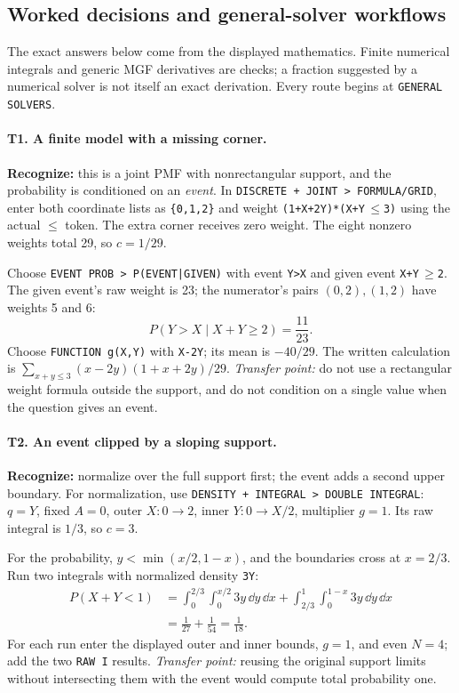 \clearpage
\subsection{Worked decisions and general-solver workflows}
The exact answers below come from the displayed mathematics. Finite numerical integrals and generic MGF derivatives are checks; a fraction suggested by a numerical solver is not itself an exact derivation. Every route begins at \texttt{GENERAL SOLVERS}.

\paragraph{T1. A finite model with a missing corner.}
\textbf{Recognize:} this is a joint PMF with nonrectangular support, and the probability is conditioned on an \emph{event}. In \texttt{DISCRETE + JOINT > FORMULA/GRID}, enter both coordinate lists as \texttt{\{0,1,2\}} and weight
\texttt{(1+X+2Y)*(X+Y}\,$\le$\texttt{3)} using the actual $\le$ token. The extra corner receives zero weight. The eight nonzero weights total 29, so $c=1/29$.

Choose \texttt{EVENT PROB > P(EVENT|GIVEN)} with event \texttt{Y>X} and given event \texttt{X+Y}\,$\ge$\texttt{2}. The given event's raw weight is 23; the numerator's pairs $(0,2),(1,2)$ have weights 5 and 6:
\[
P(Y>X\mid X+Y\ge2)=\boxed{\frac{11}{23}}.
\]
Choose \texttt{FUNCTION g(X,Y)} with \texttt{X-2Y}; its mean is $\boxed{-40/29}$. The written calculation is $\sum_{x+y\le3}(x-2y)(1+x+2y)/29$. \emph{Transfer point:} do not use a rectangular weight formula outside the support, and do not condition on a single value when the question gives an event.

\paragraph{T2. An event clipped by a sloping support.}
\textbf{Recognize:} normalize over the full support first; the event adds a second upper boundary. For normalization, use \texttt{DENSITY + INTEGRAL > DOUBLE INTEGRAL}: $q=Y$, fixed $A=0$, outer $X:0\to2$, inner $Y:0\to X/2$, multiplier $g=1$. Its raw integral is $1/3$, so $c=3$.

For the probability, $y<\min(x/2,1-x)$, and the boundaries cross at $x=2/3$. Run two integrals with normalized density \texttt{3Y}:
\[
\begin{aligned}
P(X+Y<1)
&=\int_0^{2/3}\int_0^{x/2}3y\,\dd y\,\dd x
 +\int_{2/3}^{1}\int_0^{1-x}3y\,\dd y\,\dd x\\
&=\frac1{27}+\frac1{54}=\boxed{\frac1{18}}.
\end{aligned}
\]
For each run enter the displayed outer and inner bounds, $g=1$, and even $N=4$; add the two \texttt{RAW I} results. \emph{Transfer point:} reusing the original support limits without intersecting them with the event would compute total probability one.

